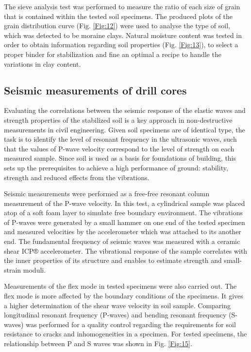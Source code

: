 \documentclass[USenglish,twocolumn]{article}
\begin{document}
The sieve analysis test was performed to measure the ratio of each size of grain that is contained within the tested soil specimens. The produced plots of the grain distribution curve (Fig. \ref{Fig:12}) were used to analyse the type of soil, which was detected to be moraine clays. Natural moisture content was tested in order to obtain information regarding soil properties (Fig. \ref{Fig:13}), to select a proper binder for stabilization and fine an optimal a recipe to handle the variations in clay content. 

\subsection{Seismic measurements of drill cores}
Evaluating the correlations between the seismic response of the elastic waves and strength properties of the stabilized soil is a key approach in non-destructive measurements in civil engineering. Given soil specimens are of identical type, the task is to identify the level of resonant frequency in the ultrasonic waves, such that the values of P-wave velocity correspond to the level of strength on each measured sample. Since soil is used as a basis for foundations of building, this sets up the prerequisites to achieve a high performance of ground: stability, strength and reduced effects from the vibrations. 

Seismic measurements were performed as a free-free resonant column measurement of the P-wave velocity. In this test, a cylindrical sample was placed atop of a soft foam layer to simulate free boundary environment. The vibrations of P-waves were generated by a small hammer on one end of the tested specimen and measured velocities by the accelerometer which was attached to its another end. The fundamental frequency of seismic waves was measured with a ceramic shear ICP® accelerometer. The vibrational response of the sample correlates with the inner properties of its structure and enables to estimate strength and small-strain moduli.

Measurements of the flex mode in tested specimens were also carried out. The flex mode is more affected by the boundary conditions of the specimens. It gives a higher determination of the shear wave velocity in soil sample. Comparing longitudinal resonant frequency (P-waves) and bending resonant frequency (S-waves) was performed for a quality control regarding the requirements for soil resistance to cracks and inhomogeneities in a specimen. For tested specimens, the relationship between P and S waves was shown in Fig. \ref{Fig:15}.
\end{document}
